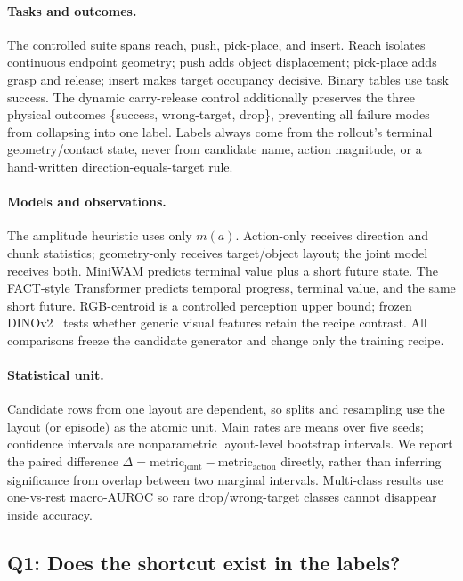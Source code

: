 \documentclass[conference]{IEEEtran}
\begin{document}
\paragraph{Tasks and outcomes.}
The controlled suite spans reach, push, pick-place, and insert. Reach isolates
continuous endpoint geometry; push adds object displacement; pick-place adds
grasp and release; insert makes target occupancy decisive. Binary tables use
task success. The dynamic carry-release control additionally preserves the
three physical outcomes \{success, wrong-target, drop\}, preventing all failure
modes from collapsing into one label. Labels always come from the rollout's
terminal geometry/contact state, never from candidate name, action magnitude,
or a hand-written direction-equals-target rule.

\paragraph{Models and observations.}
The amplitude heuristic uses only $m(a)$. Action-only receives direction and
chunk statistics; geometry-only receives target/object layout; the joint model
receives both. MiniWAM predicts terminal value plus a short future state. The
FACT-style Transformer predicts temporal progress, terminal value, and the
same short future. RGB-centroid is a controlled perception upper bound;
frozen DINOv2~\cite{oquab2024dinov2} tests whether generic visual features retain
the recipe contrast. All comparisons freeze the candidate generator and change
only the training recipe.

\paragraph{Statistical unit.}
Candidate rows from one layout are dependent, so splits and resampling use the
layout (or episode) as the atomic unit. Main rates are means over five seeds;
confidence intervals are nonparametric layout-level bootstrap intervals. We
report the paired difference $\Delta=\mathrm{metric}_{\mathrm{joint}}-
\mathrm{metric}_{\mathrm{action}}$ directly, rather than inferring significance
from overlap between two marginal intervals. Multi-class results use one-vs-rest
macro-AUROC so rare drop/wrong-target classes cannot disappear inside accuracy.

\subsection{Q1: Does the shortcut exist in the labels?}
\label{sec:q1}
\end{document}
